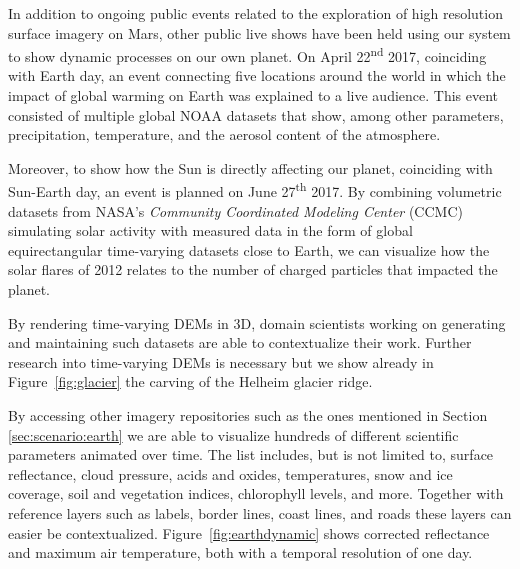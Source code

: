 \documentclass[journal]{vgtc}                %
\newcommand{\fig}[1]{Figure~\ref{fig:#1}}
\begin{document}
In addition to ongoing public events related to the exploration of high resolution surface imagery on Mars, other public live shows have been held using our system to show dynamic processes on our own planet.
On April 22\textsuperscript{nd} 2017, coinciding with Earth day, an event connecting five locations around the world in which the impact of global warming on Earth was explained to a live audience. This event consisted of multiple global NOAA datasets that show, among other parameters, precipitation, temperature, and the aerosol content of the atmosphere.

Moreover, to show how the Sun is directly affecting our planet, coinciding with Sun-Earth day, an event is planned on June 27\textsuperscript{th} 2017.
By combining volumetric datasets from NASA's \emph{Community Coordinated Modeling Center} (CCMC) simulating solar activity with measured data in the form of global equirectangular time-varying datasets close to Earth, we can visualize how the solar flares of 2012 relates to the number of charged particles that impacted the planet.


By rendering time-varying DEMs in 3D, domain scientists working on generating and maintaining such datasets are able to contextualize their work. Further research into time-varying DEMs is necessary but we show already in \fig{glacier} the carving of the Helheim glacier ridge.

By accessing other imagery repositories such as the ones mentioned in Section \ref{sec:scenario:earth} we are able to visualize hundreds of different scientific parameters animated over time. The list includes, but is not limited to, surface reflectance, cloud pressure, acids and oxides, temperatures, snow and ice coverage, soil and vegetation indices, chlorophyll levels, and more. Together with reference layers such as labels, border lines, coast lines, and roads these layers can easier be contextualized.
\fig{earthdynamic} shows corrected reflectance and maximum air temperature, both with a temporal resolution of one day.
\end{document}
